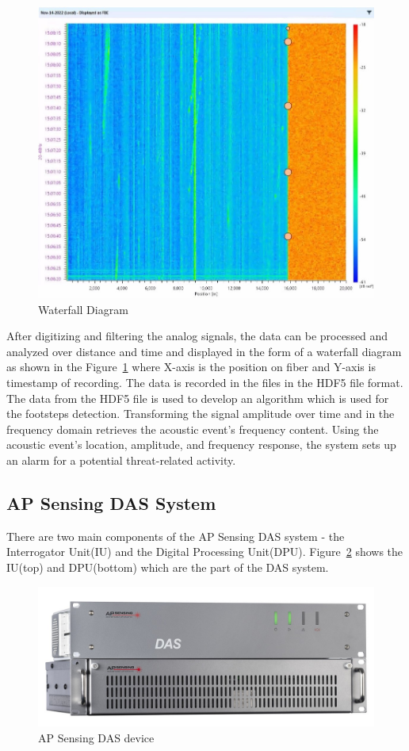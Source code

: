 \begin{figure}[h]
  \centering
  \includegraphics[width=0.7\linewidth]{Bilder/jpg/DAS Waterfall.jpg}
  \caption{Waterfall Diagram~\cite{Waterfall}}
  \label{DAS_waterfall}
\end{figure}

After digitizing and filtering the analog signals, the data can be processed and analyzed over distance and time and displayed in the form of a waterfall diagram as shown in the Figure~\ref{DAS_waterfall} where X-axis is the position on fiber and Y-axis is timestamp of recording. The data is recorded in the files in the HDF5 file format. The data from the HDF5 file is used to develop an algorithm which is used for the footsteps detection. Transforming the signal amplitude over time and in the frequency domain retrieves the acoustic event's frequency content. Using the acoustic event's location, amplitude, and frequency response, the system sets up an alarm for a potential threat-related activity. 

\subsection{AP Sensing DAS System}
There are two main components of the AP Sensing DAS system - the Interrogator Unit(IU) and the Digital Processing Unit(DPU). Figure~\ref{DAS} shows the IU(top) and DPU(bottom) which are the part of the DAS system.

\begin{figure}[h]
    \centering
    \includegraphics[width=\linewidth]{Bilder/jpg/DAS.jpg}
    \caption{AP Sensing DAS device~\cite{DAS_Manual}}
    \label{DAS}
\end{figure}

